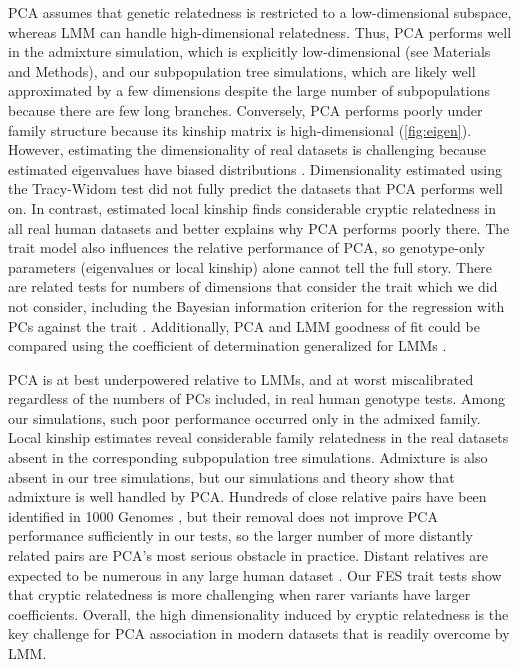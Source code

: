 \documentclass[11pt]{article}
\begin{document}
\begin{linenumbers}
PCA assumes that genetic relatedness is restricted to a low-dimensional subspace, whereas LMM can handle high-dimensional relatedness.
Thus, PCA performs well in the admixture simulation, which is explicitly low-dimensional (see Materials and Methods), and our subpopulation tree simulations, which are likely well approximated by a few dimensions despite the large number of subpopulations because there are few long branches.
Conversely, PCA performs poorly under family structure because its kinship matrix is high-dimensional (\cref{fig:eigen}).
However, estimating the dimensionality of real datasets is challenging because estimated eigenvalues have biased distributions \citep{hayashi_bias_2018}.
Dimensionality estimated using the Tracy-Widom test \citep{patterson_population_2006} did not fully predict the datasets that PCA performs well on.
In contrast, estimated local kinship finds considerable cryptic relatedness in all real human datasets and better explains why PCA performs poorly there.
The trait model also influences the relative performance of PCA, so genotype-only parameters (eigenvalues or local kinship) alone cannot tell the full story.
There are related tests for numbers of dimensions that consider the trait which we did not consider, including the Bayesian information criterion for the regression with PCs against the trait \citep{zhu_nonmetric_2009}.
Additionally, PCA and LMM goodness of fit could be compared using the coefficient of determination generalized for LMMs \citep{sun_variation_2010}.

PCA is at best underpowered relative to LMMs, and at worst miscalibrated regardless of the numbers of PCs included, in real human genotype tests.
Among our simulations, such poor performance occurred only in the admixed family.
Local kinship estimates reveal considerable family relatedness in the real datasets absent in the corresponding subpopulation tree simulations.
Admixture is also absent in our tree simulations, but our simulations and theory show that admixture is well handled by PCA.
Hundreds of close relative pairs have been identified in 1000 Genomes \citep{gazal_high_2015, al-khudhair_inference_2015, fedorova_atlas_2016, schlauch_identification_2017}, but their removal does not improve PCA performance sufficiently in our tests, so the larger number of more distantly related pairs are PCA's most serious obstacle in practice.
Distant relatives are expected to be numerous in any large human dataset \citep{henn_cryptic_2012, shchur_number_2018, loh_mixed-model_2018}.
Our FES trait tests show that cryptic relatedness is more challenging when rarer variants have larger coefficients.
Overall, the high dimensionality induced by cryptic relatedness is the key challenge for PCA association in modern datasets that is readily overcome by LMM.


\end{linenumbers}
\end{document}
